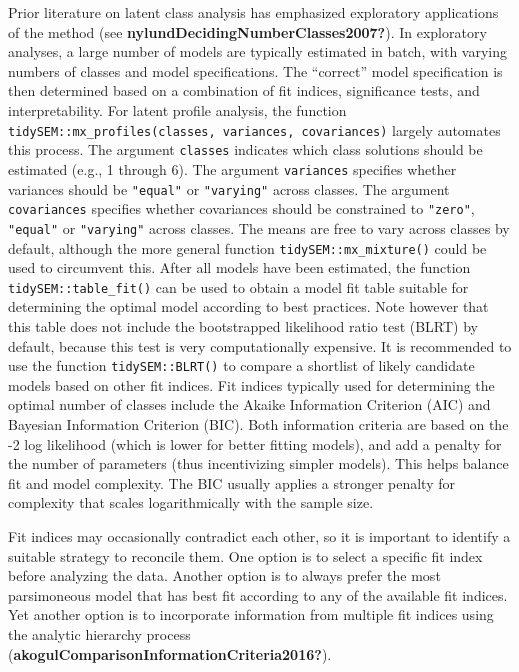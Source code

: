 \documentclass[
  ,man]{apa6}
\begin{document}
Prior literature on latent class analysis has emphasized exploratory applications of the method (see \textbf{nylundDecidingNumberClasses2007?}).
In exploratory analyses, a large number of models are typically estimated in batch,
with varying numbers of classes and model specifications.
The ``correct'' model specification is then determined based on a combination of fit indices,
significance tests,
and interpretability.
For latent profile analysis, the function \texttt{tidySEM::mx\_profiles(classes,\ variances,\ covariances)}
largely automates this process.
The argument \texttt{classes} indicates which class solutions should be estimated (e.g., 1 through 6).
The argument \texttt{variances} specifies whether variances should be \texttt{"equal"} or \texttt{"varying"} across classes.
The argument \texttt{covariances} specifies whether covariances should be constrained to \texttt{"zero"}, \texttt{"equal"} or \texttt{"varying"} across classes.
The means are free to vary across classes by default, although the more general function \texttt{tidySEM::mx\_mixture()} could be used to circumvent this.
After all models have been estimated, the function \texttt{tidySEM::table\_fit()} can be used to obtain a model fit table suitable for determining the optimal model according to best practices.
Note however that this table does not include the bootstrapped likelihood ratio test (BLRT) by default,
because this test is very computationally expensive.
It is recommended to use the function \texttt{tidySEM::BLRT()} to compare a shortlist of likely candidate models based on other fit indices.
Fit indices typically used for determining the optimal number of classes include
the Akaike Information Criterion (AIC) and Bayesian Information Criterion (BIC).
Both information criteria are based on the -2 log likelihood (which is lower for better fitting models),
and add a penalty for the number of parameters (thus incentivizing simpler models).
This helps balance fit and model complexity.
The BIC usually applies a stronger penalty for complexity that scales logarithmically with the sample size.

Fit indices may occasionally contradict each other, so it is important to identify a suitable strategy to reconcile them.
One option is to select a specific fit index before analyzing the data.
Another option is to always prefer the most parsimoneous model that has best fit according to any of the available fit indices.
Yet another option is to incorporate information from multiple fit indices using the analytic hierarchy process (\textbf{akogulComparisonInformationCriteria2016?}).
\end{document}
